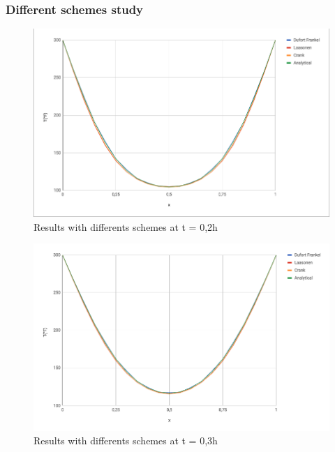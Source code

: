 \documentclass{article}
\begin{document}
            \subsubsection{Different schemes study}
                \begin{figure}[H]
                    \includegraphics[width=\textwidth]{t02.png}
                    \caption{Results with differents schemes at t = 0,2h}
                \end{figure}
                \begin{figure}[H]
                    \includegraphics[width=\textwidth]{t03.png}
                    \caption{Results with differents schemes at t = 0,3h}
                \end{figure}
\end{document}
